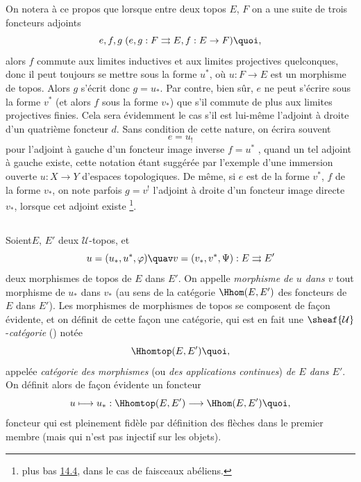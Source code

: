 \documentclass[10pt]{../fichiers-configuration-latex/smfart}
\begin{document}
On notera à ce propos que lorsque entre deux topos $E$, $F$ on a
une suite de trois foncteurs adjoints
$$
e, f, g\; (e,g: F\rightrightarrows E, f:E\rightarrow F){\quoi},
$$
alors $f$ commute aux limites inductives et aux limites projectives
quelconques, donc il peut toujours se mettre sous la forme
$u^{\ast}$, où $u:F\rightarrow E$ est un morphisme de topos. Alors
$g$ s'écrit donc $g=u_{\ast}$. Par contre, bien sûr, $e$ ne peut
s'écrire sous la forme $v^{\ast}$ (et alors $f$ sous la forme
$v_{\ast}$) que s'il commute de plus aux limites projectives finies.
Cela sera évidemment le cas s'il est lui-même l'adjoint à droite
d'un quatrième foncteur $d$. Sans condition de cette nature, on
écrira souvent
$$
e=u_{!}
$$
pour l'adjoint à gauche d'un foncteur image inverse $f=u^{\ast}$ ,
quand un tel adjoint à gauche existe, cette notation étant
suggérée par l'exemple d'une immersion ouverte $u:X\rightarrow
Y$ d'espaces topologiques. De même, si $e$ est de la forme
$v^{\ast}$, \ie $f$ de la forme $v_{\ast}$, on note parfois
$g=v^{!}$ l'adjoint à droite d'un foncteur image directe
$v_{\ast}$, lorsque cet adjoint existe \footnote[1]{\Cf plus bas \hyperref[IV.subsec14.4]{14.4},
dans le cas de faisceaux abéliens.}.

\subsection{}
Soient\pageoriginale $E$, $E'$ deux $𝒰$-topos, et
$$
u=(u_{\ast},u^{\ast},\varphi)\quav
v=(v_{\ast},v^{\ast},\Psi):E\rightrightarrows E'
$$
deux morphismes de topos de $E$ dans $E'$. On appelle
\emph{morphisme de $u$ dans $v$} tout morphisme de $u_{\ast}$ dans
$v_{\ast}$ (au sens de la catégorie $\Hhom(E,E')$ des foncteurs de
$E$ dans $E'$). Les morphismes de morphismes de topos se composent
de façon évidente, et on définit de cette façon une catégorie,
qui est en fait une $\sheaf{\mathcal{U}}$-\emph{catégorie}
() notée
$$
\Hhomtop(E,E'){\quoi},
$$
appelée \emph{catégorie des morphismes} (ou \emph{des
applications continues}) \emph{de $E$ dans $E'$}. On définit alors
de façon évidente un foncteur
$$
u\longmapsto u_{\ast}:\Hhomtop(E,E')\longrightarrow
\Hhom(E,E'){\quoi},
$$
foncteur qui est pleinement fidèle par définition des flèches
dans le premier membre (mais qui n'est pas injectif sur les objets).
\end{document}
